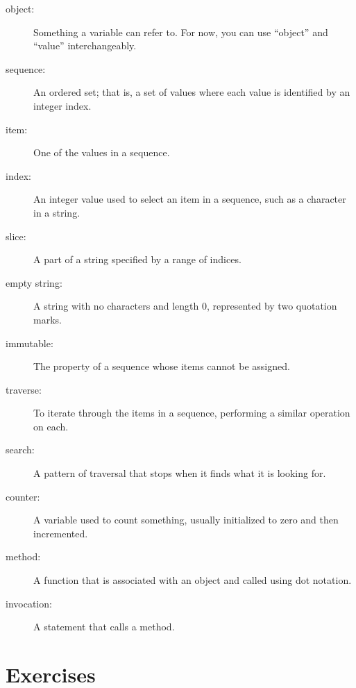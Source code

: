 \documentclass[10pt]{book}
\begin{document}
\begin{CJK}{UTF8}{gbsn}
\begin{description}

\item[object:] Something a variable can refer to.  For now,
you can use ``object'' and ``value'' interchangeably.

\item[sequence:] An ordered set; that is, a set of
values where each value is identified by an integer index.

\item[item:] One of the values in a sequence.

\item[index:] An integer value used to select an item in
a sequence, such as a character in a string.

\item[slice:] A part of a string specified by a range of indices.

\item[empty string:] A string with no characters and length 0, represented
by two quotation marks.

\item[immutable:] The property of a sequence whose items cannot
be assigned.

\item[traverse:] To iterate through the items in a sequence,
performing a similar operation on each.

\item[search:] A pattern of traversal that stops
when it finds what it is looking for.

\item[counter:] A variable used to count something, usually initialized
to zero and then incremented.

\item[method:] A function that is associated with an object and called
using dot notation.

\item[invocation:] A statement that calls a method.

\end{description}


\section{Exercises}


\end{CJK}
\end{document}
